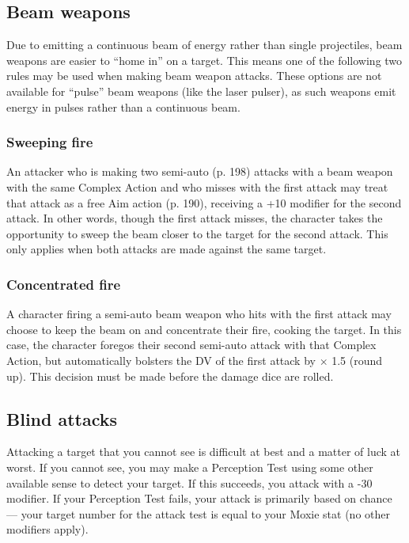 \subsection{Beam weapons}
\label{sec:combat-beam-weapons}

Due to emitting a continuous beam of energy rather than single projectiles, beam weapons are easier to ``home in'' on a target. This means one of the following two rules may be used when making beam weapon attacks. These options are not available for ``pulse'' beam weapons (like the laser pulser), as such weapons emit energy in pulses rather than a continuous beam.

\subsubsection{Sweeping fire}

An attacker who is making two semi-auto (p. 198) attacks with a beam weapon with the same Complex Action and who misses with the first attack may treat that attack as a free Aim action (p. 190), receiving a +10 modifier for the second attack. In other words, though the first attack misses, the character takes the opportunity to sweep the beam closer to the target for the second attack. This only applies when both attacks are made against the same target.

\subsubsection{Concentrated fire}

A character firing a semi-auto beam weapon who hits with the first attack may choose to keep the beam on and concentrate their fire, cooking the target. In this case, the character foregos their second semi-auto attack with that Complex Action, but automatically bolsters the DV of the first attack by $\times$ 1.5 (round up). This decision must be made before the damage dice are rolled.


\subsection{Blind attacks}
\label{sec:blind-attacks}

Attacking a target that you cannot see is difficult at best and a matter of luck at worst. If you cannot see, you may make a Perception Test using some other available sense to detect your target. If this succeeds, you attack with a -30 modifier. If your Perception Test fails, your attack is primarily based on chance --- your target number for the attack test is equal to your Moxie stat (no other modifiers apply).

